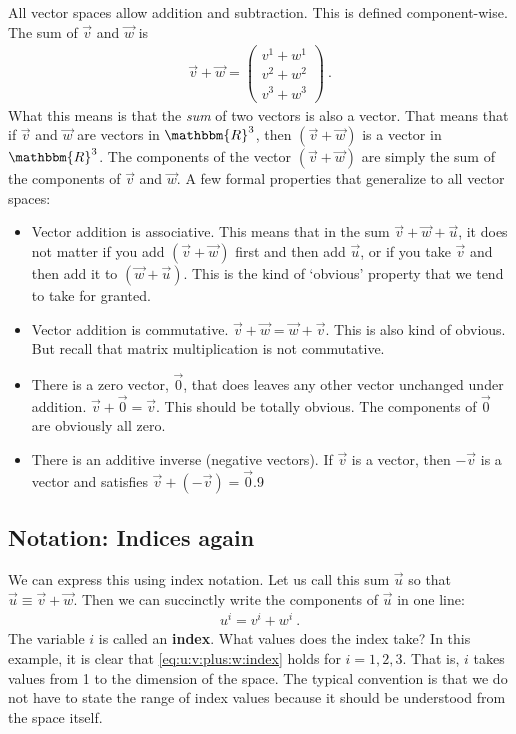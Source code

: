 \documentclass[12pt]{article}
\begin{document}
All vector spaces allow addition and subtraction. This is defined component-wise. The sum of $\vec{v}$ and $\vec{w}$ is
\begin{align}
    \vec{v}+\vec{w} = 
    \begin{pmatrix}
        v^1 + w^1\\
        v^2 + w^2\\
        v^3 + w^3
    \end{pmatrix} \ .
\end{align}
What this means is that the \emph{sum} of two vectors is also a vector. That means that if $\vec{v}$ and $\vec{w}$ are vectors in $\mathbbm{R}^3$, then $(\vec{v}+\vec{w})$ is a vector in $\mathbbm{R}^3$. The components of the vector $(\vec{v}+\vec{w})$ are simply the sum of the components of $\vec{v}$ and $\vec{w}$. 
% 
A few formal properties that generalize to all vector spaces:
\begin{itemize}
    \item Vector addition is associative. This means that in the sum $\vec{v}+\vec{w}+\vec{u}$, it does not matter if you add $(\vec{v}+\vec{w})$ first and then add $\vec{u}$, or if you take $\vec{v}$ and then add it to $(\vec{w}+\vec{u})$. This is the kind of `obvious' property that we tend to take for granted.
    \item Vector addition is commutative. $\vec{v}+\vec{w} = \vec{w}+\vec{v}$. This is also kind of obvious. But recall that matrix multiplication is not commutative.
    \item There is a zero vector, $\vec{0}$, that does leaves any other vector unchanged under addition. $\vec{v}+\vec{0} = \vec{v}$. This should be totally obvious. The components of $\vec{0}$ are obviously all zero.
    \item There is an additive inverse (negative vectors). If $\vec{v}$ is a vector, then $-\vec{v}$ is a vector and satisfies $\vec{v}+(-\vec{v}) = \vec{0}$.9
\end{itemize}





\subsection{Notation: Indices again}

We can express this using index notation. Let us call this sum $\vec{u}$ so that $\vec{u}\equiv \vec{v}+\vec{w}$. Then we can succinctly write the components of $\vec{u}$ in one line:
\begin{align}
    u^i = v^i + w^i \ .
    \label{eq:u:v:plus:w:index}
\end{align}
The variable $i$ is called an \textbf{index}. What values does the index take? In this example, it is 
clear that \eqref{eq:u:v:plus:w:index} holds for $i=1,2,3$. That is, $i$ takes values from 1 to the dimension of the space. The typical convention is that we do not have to state the range of index values because it should be understood from the space itself. 
\end{document}
